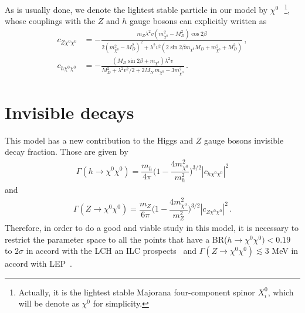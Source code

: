 As is usually done, we denote the lightest stable particle in our model by 
$\chi^0\,$~\footnote{Actually, it is the lightest stable Majorana four-component spinor $X_i^0$, which will be denote as $\chi^0$ for simplicity.}, whose couplings with the $Z$ and $h$ gauge bosons can explicitly written as~\cite{Calibbi:2015nha}
\begin{align}
c_{Z\chi^0\chi^0}&=-\frac{m_Z\lambda^2v(m_{\chi^0}^{2}-M_D^2)\cos2\beta}{2(m_{\chi^0}^{2}-M_D^2)^2+\lambda^2v^2\left(2\sin2\beta m_{\chi^0} M_D+m_{\chi^0}^{2}+M_D^2\right)} \,,\label{eq:cZXX}\\
c_{h\chi^0\chi^0}&=-\frac{(M_D\sin 2\beta+m_{\chi^0})\lambda^2v}{M_D^2+\lambda^2v^2/2+2M_N\,m_{\chi^0}-3m_{\chi^0}^{2}}\label{eq:cHXX}\,.
\end{align}










\section{Invisible decays}
%
This model has a new contribution to the Higgs and $Z$ gauge bosons invisible decay fraction. Those are given by
%
\begin{align}
\Gamma(h \rightarrow \chi^0\chi^0) = \dfrac{m_h}{4\pi}\bigg(1-\dfrac{4m_{\chi^0}^2}{m_h^2}\bigg)^{3/2}|c_{h\chi^0\chi^0}|^2
\end{align}
and
\begin{align}
\Gamma(Z \rightarrow \chi^0\chi^0) = \dfrac{m_Z}{6\pi}\bigg(1-\dfrac{4m_{\chi^0}^2}{m_Z^2}\bigg)^{3/2}|c_{Z\chi^0\chi^0}|^2 \,.
\end{align}
%
Therefore, in order to do a good and viable study in this model, it is necessary to restrict the parameter space to all the points that have a BR($h\rightarrow\chi^0\chi^0) < 0.19$ to $2\sigma$ in accord with the LCH an ILC prospects~\cite{Bechtle:2014ewa} and $\Gamma(Z\rightarrow\chi^0\chi^0) \lesssim 3$ MeV in accord with LEP~\cite{ALEPH:2005ab}.









